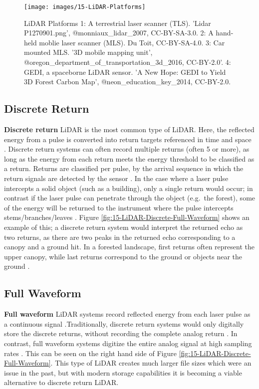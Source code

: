 \documentclass[
]{book}
\begin{document}
\begin{figure}
\texttt{[image: images/15-LiDAR-Platforms]} \caption{LiDAR Platforms 1: A terrestrial laser scanner (TLS). 'Lidar P1270901.png', @monniaux_lidar_2007, CC-BY-SA-3.0. 2: A hand-held moblie laser scanner (MLS). Du Toit, CC-BY-SA-4.0. 3: Car mounted MLS. '3D mobile mapping unit', @oregon_department_of_transportation_3d_2016, CC-BY-2.0'. 4: GEDI, a spaceborne LiDAR sensor. 'A New Hope: GEDI to Yield 3D Forest Carbon Map', @neon_education_key_2014, CC-BY-2.0.}\label{fig:15-LiDAR-Platforms}
\end{figure}

\subsection{Discrete Return}\label{discrete-return}

\textbf{Discrete return} LiDAR is the most common type of LiDAR. Here, the reflected energy from a pulse is converted into return targets referenced in time and space \citep{white_best_2013}. Discrete return systems can often record multiple returns (often 5 or more), as long as the energy from each return meets the energy threshold to be classified as a return. Returns are classified per pulse, by the arrival sequence in which the return signals are detected by the sensor \citep{uf_geomatics_-_fort_lauderdale_lidar_2016}. In the case where a laser pulse intercepts a solid object (such as a building), only a single return would occur; in contrast if the laser pulse can penetrate through the object (e.g.~the forest), some of the energy will be returned to the instrument where the pulse intercepts stems/branches/leaves \citep{white_best_2013}. Figure \ref{fig:15-LiDAR-Discrete-Full-Waveform} shows an example of this; a discrete return system would interpret the returned echo as two returns, as there are two peaks in the returned echo corresponding to a canopy and a ground hit. In a forested landscape, first returns often represent the upper canopy, while last returns correspond to the ground or objects near the ground \citep{white_best_2013}.

\subsection{Full Waveform}\label{full-waveform}

\textbf{Full waveform} LiDAR systems record reflected energy from each laser pulse as a continuous signal \citep{white_best_2013}.Traditionally, discrete return systems would only digitally store the discrete returns, without recording the complete analog return \citep{uf_geomatics_-_fort_lauderdale_lidar_2016}. In contrast, full waveform systems digitize the entire analog signal at high sampling rates \citep{uf_geomatics_-_fort_lauderdale_lidar_2016}. This can be seen on the right hand side of Figure \ref{fig:15-LiDAR-Discrete-Full-Waveform}. This type of LiDAR creates much larger file sizes which were an issue in the past, but with modern storage capabilities it is becoming a viable alternative to discrete return LiDAR.
\end{document}
